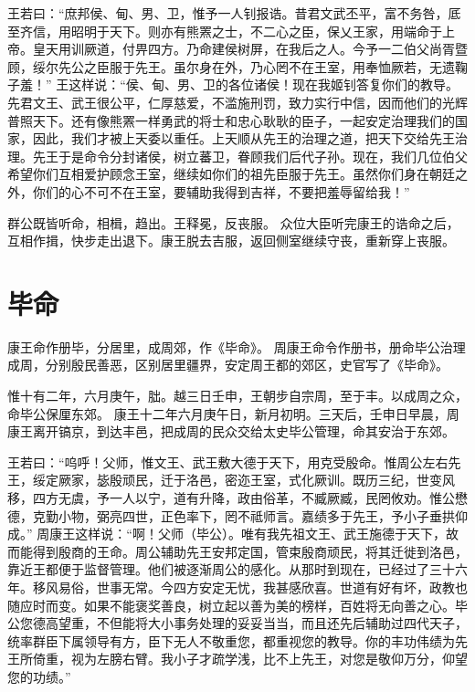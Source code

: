 \documentclass[a4paper,12pt,UTF8,twoside]{ctexbook}
\begin{document}
王若曰：“庶邦侯、甸、男、卫，惟予一人钊报诰。昔君文武丕平，富不务咎，厎至齐信，用昭明于天下。则亦有熊罴之士，不二心之臣，保乂王家，用端命于上帝。皇天用训厥道，付畀四方。乃命建侯树屏，在我后之人。今予一二伯父尚胥暨顾，绥尔先公之臣服于先王。虽尔身在外，乃心罔不在王室，用奉恤厥若，无遗鞠子羞！”
王这样说：“侯、甸、男、卫的各位诸侯！现在我姬钊答复你们的教导。先君文王、武王很公平，仁厚慈爱，不滥施刑罚，致力实行中信，因而他们的光辉普照天下。还有像熊罴一样勇武的将士和忠心耿耿的臣子，一起安定治理我们的国家，因此，我们才被上天委以重任。上天顺从先王的治理之道，把天下交给先王治理。先王于是命令分封诸侯，树立蕃卫，眷顾我们后代子孙。现在，我们几位伯父希望你们互相爱护顾念王室，继续如你们的祖先臣服于先王。虽然你们身在朝廷之外，你们的心不可不在王室，要辅助我得到吉祥，不要把羞辱留给我！”

群公既皆听命，相楫，趋出。王释冕，反丧服。
众位大臣听完康王的诰命之后，互相作揖，快步走出退下。康王脱去吉服，返回侧室继续守丧，重新穿上丧服。

\chapter{毕命}

康王命作册毕，分居里，成周郊，作《毕命》。
周康王命令作册书，册命毕公治理成周，分别殷民善恶，区别居里疆界，安定周王都的郊区，史官写了《毕命》。

惟十有二年，六月庚午，朏。越三日壬申，王朝步自宗周，至于丰。以成周之众，命毕公保厘东郊。
康王十二年六月庚午日，新月初明。三天后，壬申日早晨，周康王离开镐京，到达丰邑，把成周的民众交给太史毕公管理，命其安治于东郊。

王若曰：“呜呼！父师，惟文王、武王敷大德于天下，用克受殷命。惟周公左右先王，绥定厥家，毖殷顽民，迁于洛邑，密迩王室，式化厥训。既历三纪，世变风移，四方无虞，予一人以宁，道有升降，政由俗革，不臧厥臧，民罔攸劝。惟公懋德，克勤小物，弼亮四世，正色率下，罔不祗师言。嘉绩多于先王，予小子垂拱仰成。”
周康王这样说：“啊！父师（毕公）。唯有我先祖文王、武王施德于天下，故而能得到殷商的王命。周公辅助先王安邦定国，管束殷商顽民，将其迁徙到洛邑，靠近王都便于监督管理。他们被逐渐周公的感化。从那时到现在，已经过了三十六年。移风易俗，世事无常。今四方安定无忧，我甚感欣喜。世道有好有坏，政教也随应时而变。如果不能褒奖善良，树立起以善为美的榜样，百姓将无向善之心。毕公您德高望重，不但能将大小事务处理的妥妥当当，而且还先后辅助过四代天子，统率群臣下属领导有方，臣下无人不敬重您，都重视您的教导。你的丰功伟绩为先王所倚重，视为左膀右臂。我小子才疏学浅，比不上先王，对您是敬仰万分，仰望您的功绩。”
\end{document}
